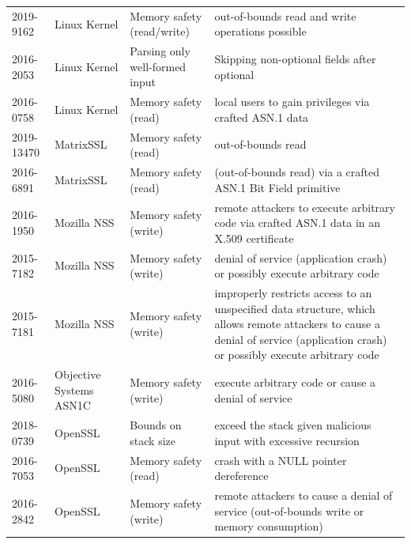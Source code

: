 \documentclass[10p,conference]{IEEEtran}
\begin{document}
\begin{longtable}{ l l l p{25em} }
2019-9162    & Linux Kernel  & Memory safety (read/write) & out-of-bounds read and write operations possible \\
2016-2053    & Linux Kernel  & Parsing only well-formed input & Skipping non-optional fields after optional \\ 
2016-0758    & Linux Kernel  & Memory safety (read) & local users to gain privileges via crafted ASN.1 data \\ 
2019-13470   & MatrixSSL     & Memory safety (read) & out-of-bounds read \\ 
2016-6891    & MatrixSSL     & Memory safety (read) & (out-of-bounds read) via a crafted ASN.1 Bit Field primitive \\ 
2016-1950    & Mozilla NSS   & Memory safety (write) & remote attackers to execute arbitrary code via crafted ASN.1 data in an X.509 certificate \\ 
2015-7182    & Mozilla NSS   & Memory safety (write) & denial of service (application crash) or possibly execute arbitrary code \\ 
2015-7181    & Mozilla NSS   & Memory safety (write) & improperly restricts access to an unspecified data structure, which allows remote attackers to cause a denial of service (application crash) or possibly execute arbitrary code \\ 
2016-5080    & Objective Systems ASN1C & Memory safety (write) & execute arbitrary code or cause a denial of service \\ 
2018-0739    & OpenSSL       & Bounds on stack size & exceed the stack given malicious input with excessive recursion \\ 
2016-7053    & OpenSSL       & Memory safety (read) & crash with a NULL pointer dereference \\ 
2016-2842    & OpenSSL       & Memory safety (write) & remote attackers to cause a denial of service (out-of-bounds write or memory consumption) \\ 
 

\end{longtable}
\end{document}
